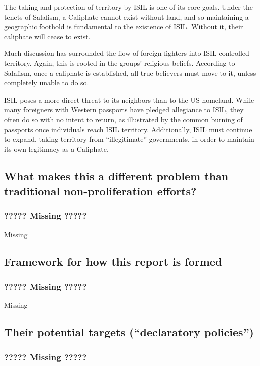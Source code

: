 \documentclass{report}
\begin{document}
The taking and protection of territory by ISIL is one of its core goals. Under the tenets of Salafism, a Caliphate cannot exist without land, and so maintaining a geographic foothold is fundamental to the existence of ISIL. Without it, their caliphate will cease to exist. 

Much discussion has surrounded the flow of foreign fighters into ISIL controlled territory. Again, this is rooted in the groups' religious beliefs. According to Salafism, once a caliphate is established, all true believers must move to it, unless completely unable to do so. 

ISIL poses a more direct threat to its neighbors than to the US homeland. While many foreigners with Western passports have pledged allegiance to ISIL, they often do so with no intent to return, as illustrated by the common burning of passports once individuals reach ISIL territory. Additionally, ISIL must continue to expand, taking territory from “illegitimate” governments, in order to maintain its own legitimacy as a Caliphate. 


\subsection{What makes this a different problem than traditional non-proliferation efforts?}

\subsubsection{????? Missing ?????}

Missing


\subsection{Framework for how this report is formed}

\subsubsection{????? Missing ?????}

Missing


\subsection{Their potential targets (“declaratory policies”)}

\subsubsection{????? Missing ?????}
\end{document}
